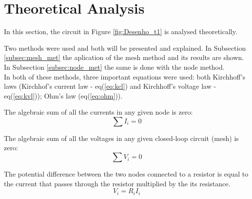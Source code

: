 
\section{Theoretical Analysis}
\label{sec:analysis}



In this section, the circuit in Figure \ref{fig:Desenho_t1} is analysed theoretically.

Two methods were used and both will be presented and explained. In Subsection \ref{subsec:mesh_met}
the aplication of the mesh method and its results are shown. In Subsection \ref{subsec:node_met} the
same is done with the  node method. \\

In both of these methods, three important equations were used: both Kirchhoff's laws (Kirchhof's
current law - eq(\ref{eq:kcl}) and Kirchhoff's voltage law - eq(\ref{eq:kvl})); Ohm's law (eq(\ref{eq:ohm})).

The algebraic sum of all the currents in any given node is zero:
\begin{equation}
	\sum I_i = 0
	\label{eq:kcl}
\end{equation}

The algebraic sum of all the voltages in any given closed-loop circuit (mesh) is zero:
\begin{equation}
	\sum V_i = 0
	\label{eq:kvl}
\end{equation}

The potential difference between the two nodes connected to a resistor is equal to the current that 
passes through the resistor multiplied by the its resistance.
\begin{equation}
	V_i = R_iI_i
	\label{eq:ohm}
\end{equation}




